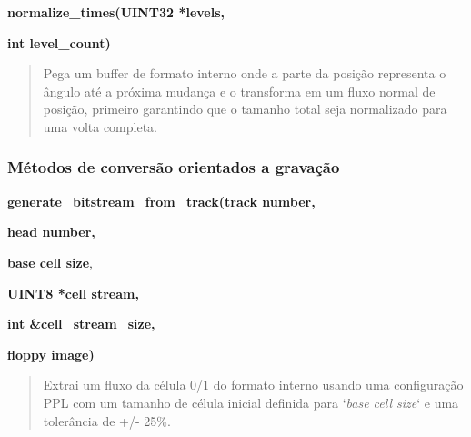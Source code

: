 \documentclass[letterpaper,10pt,brazil]{sphinxmanual}
\begin{document}
\begin{DUlineblock}{0em}
\item[] \textbf{normalize\_times(UINT32 *levels,}
\item[]
\begin{DUlineblock}{\DUlineblockindent}
\item[] \textbf{int level\_count)}
\end{DUlineblock}
\end{DUlineblock}
\begin{quote}

Pega um buffer de formato interno onde a parte da posição representa o
ângulo até a próxima mudança e o transforma em um fluxo normal de
posição, primeiro garantindo que o tamanho total seja normalizado para
uma volta completa.
\end{quote}


\subsubsection{Métodos de conversão orientados a gravação}
\label{techspecs/floppy:metodos-de-conversao-orientados-a-gravacao}
\begin{DUlineblock}{0em}
\item[] \textbf{generate\_bitstream\_from\_track(track number,}
\item[]
\begin{DUlineblock}{\DUlineblockindent}
\item[] \textbf{head number,}
\item[] \textbf{base cell size},
\item[] \textbf{UINT8 *cell stream,}
\item[] \textbf{int \&cell\_stream\_size,}
\item[] \textbf{floppy image)}
\end{DUlineblock}
\end{DUlineblock}
\begin{quote}

Extrai um fluxo da célula 0/1 do formato interno usando uma
configuração PPL com um tamanho de célula inicial definida para
`\emph{base cell size}` e uma tolerância de +/- 25\%.
\end{quote}
\end{document}
